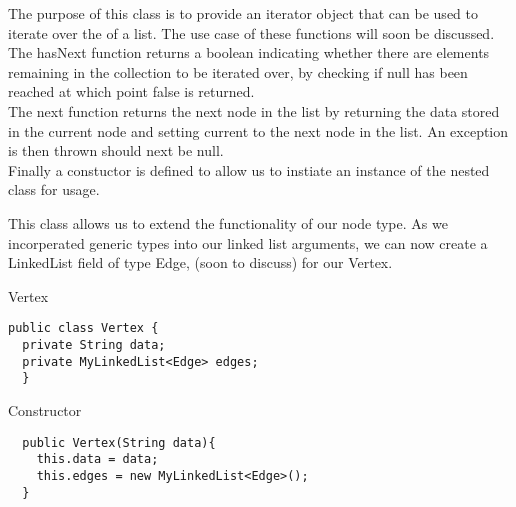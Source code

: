 \documentclass[a4paper]{article}
\begin{document}
The purpose of this class is to provide an iterator object that can be used to iterate over the of a list.
The use case of these functions will soon be discussed.\\

The hasNext function returns a boolean indicating whether there are elements remaining in the collection to be iterated over,
by checking if null has been reached at which point false is returned. \\

The next function returns the next node in the list by
returning the data stored in the current node and setting current to the next node in the list.
An exception is then thrown should next be null. \\

Finally a constuctor is defined to allow us to instiate an instance of the nested class for usage. \\

\newpage




\vspace{6mm}
\makeatletter
\renewcommand{\ALG@name}{Class}
\makeatother
\setcounter{algorithm}{1}

This class allows us to extend the functionality of our 
node type. As we incorperated generic types into our linked list arguments,
we can now create a LinkedList field of type Edge, (soon to discuss) for our Vertex.


\vspace{12mm}

\begin{algorithm}
\caption{Vertex}\label{euclid}
\begin{verbatim}
public class Vertex {
  private String data;
  private MyLinkedList<Edge> edges;
  }
\end{verbatim}
\end{algorithm}

\makeatletter
\renewcommand{\ALG@name}{Vertex Function}
\makeatother
\setcounter{algorithm}{0}


\vspace{6mm}


\begin{algorithm}
\caption{Constructor}\label{euclid}
\begin{verbatim}
  public Vertex(String data){
    this.data = data;
    this.edges = new MyLinkedList<Edge>();
  }
\end{verbatim}
\end{algorithm}
\end{document}
